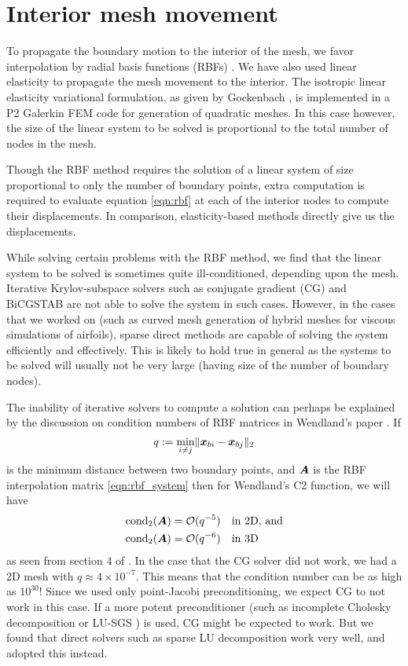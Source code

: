 \section{Interior mesh movement}

To propagate the boundary motion to the interior of the mesh, we favor interpolation by radial basis functions (RBFs) \cite{mm:rbf}. We have also used linear elasticity to propagate the mesh movement to the interior. The isotropic linear elasticity variational formulation, as given by Gockenbach \cite{gockenbach}, is implemented in a P2 Galerkin FEM code for generation of quadratic meshes. In this case however, the size of the linear system to be solved is proportional to the total number of nodes in the mesh.

Though the RBF method requires the solution of a linear system of size proportional to only the number of boundary points, extra computation is required to evaluate equation \eqref{eqn:rbf} at each of the interior nodes to compute their displacements. In comparison, elasticity-based methods directly give us the displacements. 

While solving certain problems with the RBF method, we find that the linear system to be solved is sometimes quite ill-conditioned, depending upon the mesh. Iterative Krylov-subspace solvers such as conjugate gradient (CG) and BiCGSTAB are not able to solve the system in such cases. However, in the cases that we worked on (such as curved mesh generation of hybrid meshes for viscous simulations of airfoils), sparse direct methods are capable of solving the system efficiently and effectively. This is likely to hold true in general as the systems to be solved will usually not be very large (having size of the number of boundary nodes).

The inability of iterative solvers to compute a solution can perhaps be explained by the discussion on condition numbers of RBF matrices in Wendland's paper \cite{rbf:errorwendland}. If
\begin{equation}
q := \min_{i\neq j} \lVert \boldsymbol{x}_{bi} - \boldsymbol{x}_{bj} \rVert_2
\end{equation}
is the minimum distance between two boundary points, and $\boldsymbol{A}$ is the RBF interpolation matrix \eqref{eqn:rbf_system} then for Wendland's C2 function, we will have
\begin{equation}
\begin{aligned}
\text{cond}_2 (\boldsymbol{A}) &= \mathcal{O}(q^{-5}) \quad \text{in 2D, and} \\
\text{cond}_2 (\boldsymbol{A}) &= \mathcal{O}(q^{-6}) \quad \text{in 3D}
\end{aligned}
\end{equation}
as seen from section 4 of \cite{rbf:errorwendland}. In the case that the CG solver did not work, we had a 2D mesh with $q \approx 4 \times 10^{-7}$. This means that the condition number can be as high as $10^{30}$! Since we used only point-Jacobi preconditioning, we expect CG to not work in this case. If a more potent preconditioner (such as incomplete Cholesky decomposition or LU-SGS \cite{lusgs_precon}) is used, CG might be expected to work. But we found that direct solvers such as sparse LU decomposition work very well, and adopted this instead.

